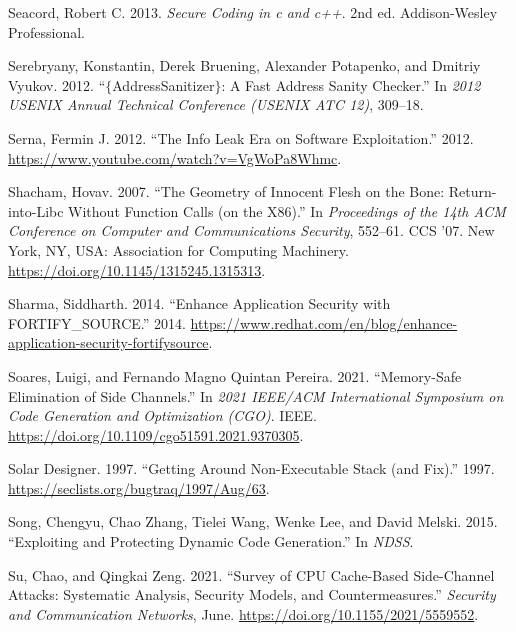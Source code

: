 \documentclass[
  a4paper,
]{report}
\newlength{\cslhangindent}
\newlength{\cslentryspacingunit} %
\newenvironment{CSLReferences}[2] %
 {%
  \setlength{\parindent}{0pt}
  \ifodd #1
  \let\oldpar\par
  \def\par{\hangindent=\cslhangindent\oldpar}
  \fi
  \setlength{\parskip}{#2\cslentryspacingunit}
 }%
 {}
\begin{document}
\begin{CSLReferences}{1}{0}
\leavevmode{}%
Seacord, Robert C. 2013. \emph{Secure Coding in c and c++}. 2nd ed.
Addison-Wesley Professional.

\leavevmode{}%
Serebryany, Konstantin, Derek Bruening, Alexander Potapenko, and Dmitriy
Vyukov. 2012. {``\(\{\)AddressSanitizer\(\}\): A Fast Address Sanity
Checker.''} In \emph{2012 USENIX Annual Technical Conference (USENIX ATC
12)}, 309--18.

\leavevmode{}%
Serna, Fermin J. 2012. {``The Info Leak Era on Software Exploitation.''}
2012. \url{https://www.youtube.com/watch?v=VgWoPa8Whmc}.

\leavevmode{}%
Shacham, Hovav. 2007. {``The Geometry of Innocent Flesh on the Bone:
Return-into-Libc Without Function Calls (on the X86).''} In
\emph{Proceedings of the 14th ACM Conference on Computer and
Communications Security}, 552--61. CCS '07. New York, NY, USA:
Association for Computing Machinery.
\url{https://doi.org/10.1145/1315245.1315313}.

\leavevmode{}%
Sharma, Siddharth. 2014. {``Enhance Application Security with
FORTIFY\_SOURCE.''} 2014.
\url{https://www.redhat.com/en/blog/enhance-application-security-fortifysource}.

\leavevmode{}%
Soares, Luigi, and Fernando Magno Quintan Pereira. 2021. {``Memory-Safe
Elimination of Side Channels.''} In \emph{2021 {IEEE}/{ACM}
International Symposium on Code Generation and Optimization ({CGO})}.
{IEEE}. \url{https://doi.org/10.1109/cgo51591.2021.9370305}.

\leavevmode{}%
Solar Designer. 1997. {``Getting Around Non-Executable Stack (and
Fix).''} 1997. \url{https://seclists.org/bugtraq/1997/Aug/63}.

\leavevmode{}%
Song, Chengyu, Chao Zhang, Tielei Wang, Wenke Lee, and David Melski.
2015. {``Exploiting and Protecting Dynamic Code Generation.''} In
\emph{NDSS}.

\leavevmode{}%
Su, Chao, and Qingkai Zeng. 2021. {``Survey of {CPU} Cache-Based
Side-Channel Attacks: Systematic Analysis, Security Models, and
Countermeasures.''} \emph{Security and Communication Networks}, June.
\url{https://doi.org/10.1155/2021/5559552}.


\end{CSLReferences}
\end{document}
